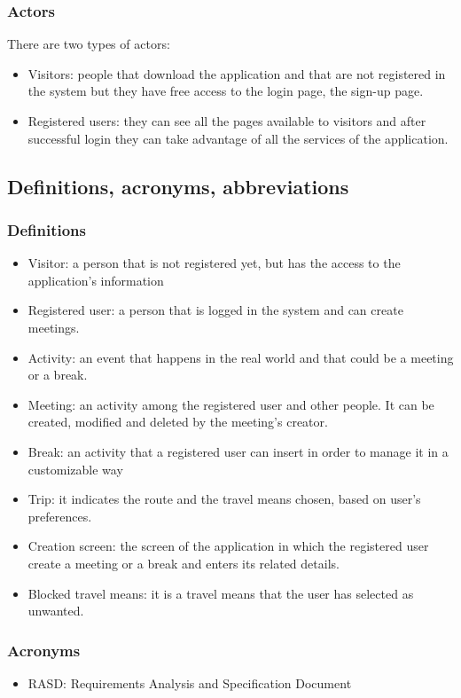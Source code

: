 \documentclass[12pt,titlepage]{article}
\begin{document}
\subsubsection{Actors}\label{RASD}
There are two types of actors:
\begin{itemize}
\item Visitors: people that download the application and that are not registered in the system but they have free access to the login page, the sign-up page.
\item Registered users: they can see all the pages available to visitors and after successful login they can take advantage of all the services of the application.

\end{itemize}


\subsection{Definitions, acronyms, abbreviations}\label{RASD}
\subsubsection{Definitions}\label{RASD}
\begin{itemize}
\item Visitor: a person that is not registered yet, but has the access to the application's information 
\item	Registered user: a person that is logged in the system and can create meetings.
\item	Activity: an event that happens in the real world and that could be a meeting or a break.
\item	Meeting: an activity among the registered user and other people. It can be created, modified and deleted by the meeting's creator. 
\item	Break: an activity that a registered user can insert in order to manage it in a customizable way
\item Trip: it indicates the route and the travel means chosen, based on user's preferences.
\item	Creation screen: the screen of the application in which the registered user create a meeting or a break and enters its related details.
\item Blocked travel means: it is a travel means that the user has selected as unwanted.
\end{itemize}
\subsubsection{Acronyms}\label{RASD}
\begin{itemize}
\item	RASD: Requirements Analysis and Specification Document
\end{itemize}
\end{document}
